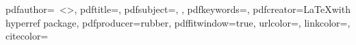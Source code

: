 
\newcommand{\contactauthor}{\myAuthorFullName~\textless\href{mailto:\myAuthorEmail}{\myAuthorEmail}\textgreater}

{
  \newcommand{\keywordsforpdf}{\myThesisKeywordsEnglish}
}
{
  \newcommand{\keywordsforpdf}{\myThesisKeywords}
}

\newcommand{\underscoreSpacingFour}{\_\_\_\_}
\newcommand{\spacingFour}{~~~~}

\hypersetup
{
  pdfauthor={\myAuthorFullName~\textless\href{mailto:\myAuthorEmail}{\myAuthorEmail}\textgreater},
  pdftitle={\myBookTitle},
  pdfsubject={\myDegreefull, \myWorkTypeFull},
  pdfkeywords={\keywordsforpdf},
  pdfcreator={\LaTeX with hyperref package},
  pdfproducer={rubber},
  pdffitwindow={true},
  urlcolor=\myurlcolor,
  linkcolor=\mylinkcolor,
  citecolor=\mycitecolor
}




